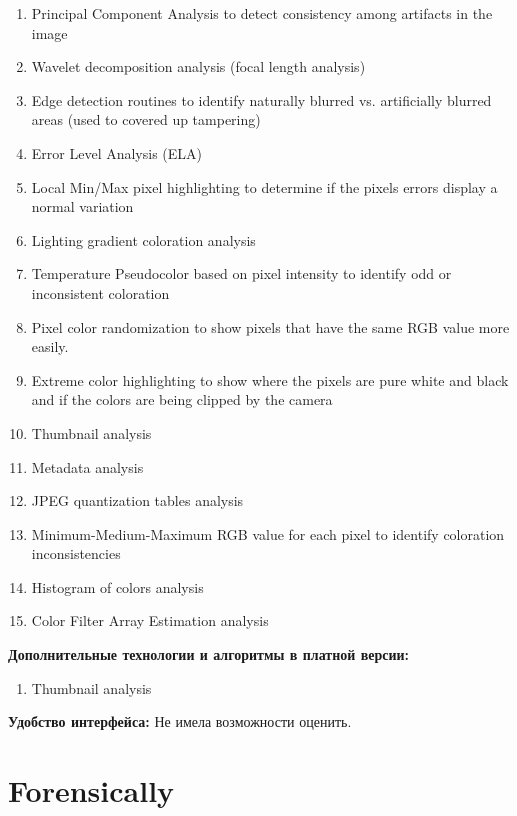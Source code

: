 \begin{enumerate}
  \item Principal Component Analysis to detect consistency among artifacts in the image
  \item Wavelet decomposition analysis (focal length analysis)
    
  \item Edge detection routines to identify naturally blurred vs. artificially blurred areas (used to covered up tampering)
  
  \item Error Level Analysis (ELA)
  
  \item Local Min/Max pixel highlighting to determine if the pixels errors display a normal variation
  \item Lighting gradient coloration analysis
  \item Temperature Pseudocolor based on pixel intensity to identify odd or inconsistent coloration
  \item Pixel color randomization to show pixels that have the same RGB value more easily.
  \item Extreme color highlighting to show where the pixels are pure white and black and if the colors are being clipped by the camera
    \item Thumbnail analysis
    \item Metadata analysis
	\item JPEG quantization tables analysis
    \item Minimum-Medium-Maximum RGB value for each pixel to identify coloration inconsistencies 
    \item Histogram of colors analysis
	\item Color Filter Array Estimation analysis
\end{enumerate} 

\textbf{Дополнительные технологии и алгоритмы в платной версии:}
\begin{enumerate}
  \item Thumbnail analysis
\end{enumerate} 

\textbf{Удобство интерфейса:}
Не имела возможности оценить. 

\newpage

\section{Forensically}

